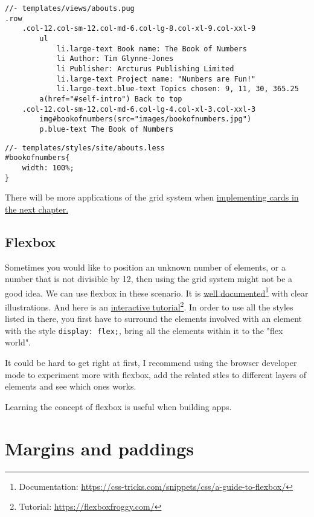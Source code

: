 \begin{lstlisting}[language=pug]
//- templates/views/abouts.pug
.row
    .col-12.col-sm-12.col-md-6.col-lg-8.col-xl-9.col-xxl-9
        ul
            li.large-text Book name: The Book of Numbers
            li Author: Tim Glynne-Jones
            li Publisher: Arcturus Publishing Limited
            li.large-text Project name: "Numbers are Fun!"
            li.large-text.blue-text Topics chosen: 9, 11, 30, 365.25
        a(href="#self-intro") Back to top
    .col-12.col-sm-12.col-md-6.col-lg-4.col-xl-3.col-xxl-3
        img#bookofnumbers(src="images/bookofnumbers.jpg")
        p.blue-text The Book of Numbers
\end{lstlisting}

\begin{lstlisting}[language=pug]
//- templates/styles/site/abouts.less
#bookofnumbers{
    width: 100%;
}
\end{lstlisting}

There will be more applications of the grid system when \hyperref[sec:cards]{implementing cards in the next chapter.}
\subsection{Flexbox}

Sometimes you would like to position an unknown number of elements, or a number that is not divisible by 12, then using the grid system might not be a good idea. We can use flexbox in these scenario. It is \href{https://css-tricks.com/snippets/css/a-guide-to-flexbox/}{well documented}\footnote{Documentation: \url{https://css-tricks.com/snippets/css/a-guide-to-flexbox/}} with clear illustrations. And here is an \href{https://flexboxfroggy.com/}{interactive tutorial}\footnote{Tutorial: \url{https://flexboxfroggy.com/}}. In order to use all the styles listed in there, you first have to surround the elements involved with an element with the style \texttt{display: flex;}, bring all the elements within it to the "flex world".

It could be hard to get right at first, I recommend using the browser developer mode to experiment more with flexbox, add the related stles to different layers of elements and see which ones works. 

Learning the concept of flexbox is useful when building apps.

\section{Margins and paddings}
\label{sec:margin}

